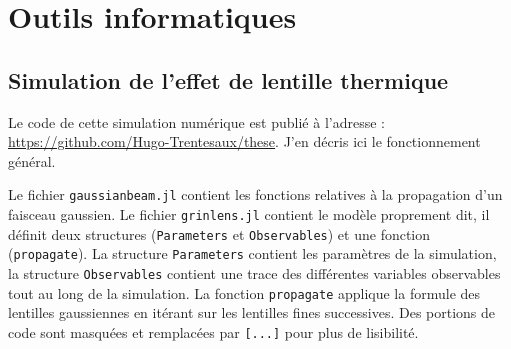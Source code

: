 \chapter{Outils informatiques}\label{AppA}

\section{Simulation de l'effet de lentille thermique}\label{APPsimuthermallens}

Le code de cette simulation numérique est publié à l'adresse :
\\ \href{https://github.com/Hugo-Trentesaux/these}{https://github.com/Hugo-Trentesaux/these}.
J'en décris ici le fonctionnement général.

Le fichier \verb|gaussianbeam.jl| contient les fonctions relatives à la propagation d'un faisceau gaussien. Le fichier \verb|grinlens.jl| contient le modèle proprement dit, il définit deux structures (\verb|Parameters| et \verb|Observables|) et une fonction (\verb|propagate|). La structure \verb|Parameters| contient les paramètres de la simulation, la structure \verb|Observables| contient une trace des différentes variables observables tout au long de la simulation. La fonction \verb|propagate| applique la formule des lentilles gaussiennes en itérant sur les lentilles fines successives. Des portions de code sont masquées et remplacées par \verb|[...]| pour plus de lisibilité.

